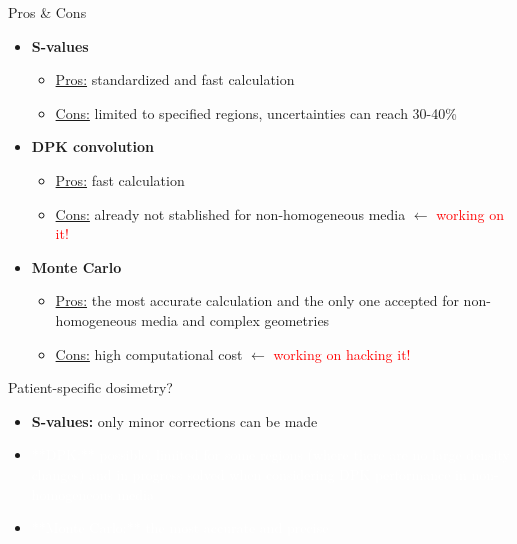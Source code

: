 \documentclass[ignorenonframetext,]{beamer}
\providecommand{\tightlist}{%
  \setlength{\itemsep}{0pt}\setlength{\parskip}{0pt}}
\begin{document}
\begin{frame}{Pros \& Cons}
\protect\hypertarget{pros-cons}{}

\begin{itemize}
\tightlist
\item
  \textbf{S-values}

  \begin{itemize}
  \tightlist
  \item
    \underline{Pros:} standardized and fast calculation
  \item
    \underline{Cons:} limited to specified regions, uncertainties can
    reach 30-40\%
  \end{itemize}
\item
  \textbf{DPK convolution}

  \begin{itemize}
  \tightlist
  \item
    \underline{Pros:} fast calculation
  \item
    \underline{Cons:} already not stablished for non-homogeneous media
    \(\leftarrow\) \textcolor{red}{working on it!}
  \end{itemize}
\item
  \textbf{Monte Carlo}

  \begin{itemize}
  \tightlist
  \item
    \underline{Pros:} the most accurate calculation and the only one
    accepted for non-homogeneous media and complex geometries
  \item
    \underline{Cons:} high computational cost \(\leftarrow\)
    \textcolor{red}{working on hacking it!}
  \end{itemize}
\end{itemize}

\end{frame}

\begin{frame}{Patient-specific dosimetry?}
\protect\hypertarget{patient-specific-dosimetry}{}

\begin{itemize}
\item
  \textbf{S-values:} only minor corrections can be made
\item
  \textcolor{white}{**DPK:** possible, limited for some regions (where there are no large density changes) and in progress solved when considering DPK performance in non-homogeneous media}
\item
  \textcolor{white}{**Monte Carlo:** the most accurate and precise}
\end{itemize}

\end{frame}
\end{document}
